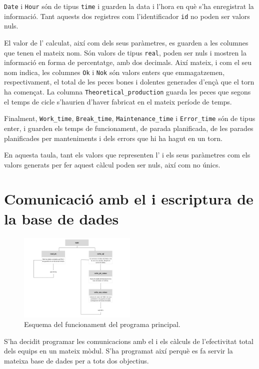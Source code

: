 \documentclass{tfgitic}[2022/06/30]
\begin{document}
\texttt{Date} i \texttt{Hour} són de tipus \texttt{time} i guarden la data i l'hora en què s'ha enregistrat la informació. Tant aquests dos registres com l'identificador \texttt{id} no poden ser valors nuls.

El valor de l' calculat, així com dels seus paràmetres, es guarden a les columnes que tenen el mateix nom. Són valors de tipus \texttt{real}, poden ser nuls i mostren la informació en forma de percentatge, amb dos decimals. Així mateix, i com el seu nom indica, les columnes \texttt{Ok} i \texttt{Nok} són valors enters que emmagatzemen, respectivament, el total de les peces bones i dolentes generades d'ençà que el torn ha començat. La columna \texttt{Theoretical\_production} guarda les peces que segons el temps de cicle s'haurien d'haver fabricat en el mateix període de temps.

Finalment, \texttt{Work\_time}, \texttt{Break\_time}, \texttt{Maintenance\_time} i \texttt{Error\_time} són de tipus enter, i guarden els temps de funcionament, de parada planificada, de les parades planificades per manteniments i dels errors que hi ha hagut en un torn.

En aquesta taula, tant els valors que representen l' i els seus paràmetres com els valors generats per fer aquest càlcul poden ser nuls, així com no únics.

\chapter{Comunicació amb el  i escriptura de la base de dades}
\label{Chapter:comPlc}
\begin{figure}[h]
\centering
\includegraphics[width=0.5\textwidth]{img/mainProgramDiagram.png}
\caption{Esquema del funcionament del programa principal.}
\label{image:maindiagram}
\end{figure}

S'ha decidit programar les comunicacions amb el  i els càlculs de l'efectivitat total dels equips en un mateix mòdul. S'ha programat així perquè es fa servir la mateixa base de dades per a tots dos objectius.
\end{document}
